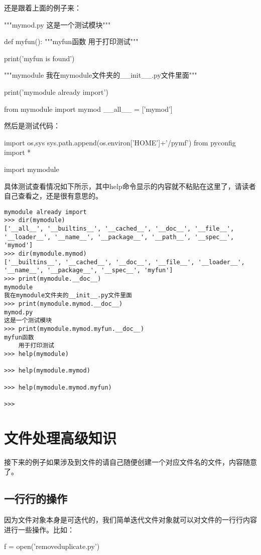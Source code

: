 \documentclass[12pt,oneside]{book}
\begin{document}
\begin{common-format}
还是跟着上面的例子来：
\begin{tcbpython}
"""mymod.py
这是一个测试模块"""

def myfun():
    """myfun函数
    用于打印测试"""

    print('myfun is found')
\end{tcbpython}

\begin{tcbpython}
"""mymodule
我在mymodule文件夹的__init__.py文件里面"""

print('mymodule already import')

from mymodule import mymod
__all__ = ['mymod']
\end{tcbpython}

然后是测试代码：
\begin{tcbpython}
import os,sys
sys.path.append(os.environ['HOME']+'/pymf')
from pyconfig import *

import  mymodule
\end{tcbpython}


具体测试查看情况如下所示，其中help命令显示的内容就不粘贴在这里了，请读者自己查看之，还是很有意思的。
\begin{Verbatim}
mymodule already import
>>> dir(mymodule)
['__all__', '__builtins__', '__cached__', '__doc__', '__file__', '__loader__', '__name__', '__package__', '__path__', '__spec__', 'mymod']
>>> dir(mymodule.mymod)
['__builtins__', '__cached__', '__doc__', '__file__', '__loader__', '__name__', '__package__', '__spec__', 'myfun']
>>> print(mymodule.__doc__)
mymodule
我在mymodule文件夹的__init__.py文件里面
>>> print(mymodule.mymod.__doc__)
mymod.py
这是一个测试模块
>>> print(mymodule.mymod.myfun.__doc__)
myfun函数
    用于打印测试
>>> help(mymodule)

>>> help(mymodule.mymod)

>>> help(mymodule.mymod.myfun)

>>> 
\end{Verbatim}





\chapter{文件处理高级知识}
接下来的例子如果涉及到文件的请自己随便创建一个对应文件名的文件，内容随意了。


\section{一行行的操作}
因为文件对象本身是可迭代的，我们简单迭代文件对象就可以对文件的一行行内容进行一些操作。比如：
\begin{tcbpython}
f = open('removeduplicate.py')


\end{tcbpython}
\end{common-format}
\end{document}
